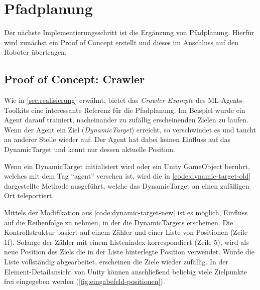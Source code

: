 \section{Pfadplanung}
Der nächste Implementierungsschritt ist die Ergänzung von Pfadplanung.
Hierfür wird zunächst ein Proof of Concept erstellt und dieses im Anschluss auf den Roboter übertragen.

\subsection{Proof of Concept: Crawler}
Wie in \autoref{sec:realisierung} erwähnt, bietet das \emph{Crawler-Example} des ML-Agents-Toolkits eine interessante Referenz für die Pfadplanung.
Im Beispiel wurde ein Agent darauf trainiert, nacheinander zu zufällig erscheinenden Zielen zu laufen.
Wenn der Agent ein Ziel (\emph{DynamicTarget}) erreicht, so verschwindet es und taucht an anderer Stelle wieder auf.
Der Agent hat dabei keinen Einfluss auf das DynamicTarget und kennt nur dessen aktuelle Position.

Wenn ein DynamicTarget initialisiert wird oder ein Unity GameObject berührt, welches mit dem Tag \enquote{agent} versehen ist, wird die in \autoref{code:dynamic-target-old} dargestellte Methode ausgeführt, welche das DynamicTarget an einen zufälligen Ort teleportiert.

\begin{figure}
    
\end{figure}

Mittels der Modifikation aus \autoref{code:dynamic-target-new} ist es möglich, Einfluss auf die Reihenfolge zu nehmen, in der die DynamicTargets erscheinen.
Die Kontrollstruktur basiert auf einem Zähler und einer Liste von Positionen (Zeile 1f).
Solange der Zähler mit einem Listenindex korrespondiert (Zeile 5), wird als neue Position des Ziels die in der Liste hinterlegte Position verwendet.
Wurde die Liste vollständig abgearbeitet, erscheinen die Ziele wieder zufällig.
In der Element-Detailansicht von Unity können anschließend beliebig viele Zielpunkte frei eingegeben werden (\autoref{fig:eingabefeld-positionen}).

\begin{figure}
    
\end{figure}


